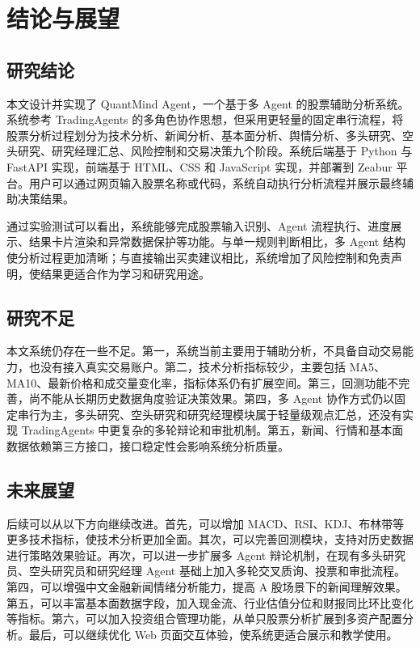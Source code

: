 \documentclass[UTF8,a4paper,12pt]{ctexart}
\begin{document}
\section{结论与展望}

\subsection{研究结论}

本文设计并实现了 QuantMind Agent，一个基于多 Agent 的股票辅助分析系统。系统参考 TradingAgents 的多角色协作思想，但采用更轻量的固定串行流程，将股票分析过程划分为技术分析、新闻分析、基本面分析、舆情分析、多头研究、空头研究、研究经理汇总、风险控制和交易决策九个阶段。系统后端基于 Python 与 FastAPI 实现，前端基于 HTML、CSS 和 JavaScript 实现，并部署到 Zeabur 平台。用户可以通过网页输入股票名称或代码，系统自动执行分析流程并展示最终辅助决策结果。

通过实验测试可以看出，系统能够完成股票输入识别、Agent 流程执行、进度展示、结果卡片渲染和异常数据保护等功能。与单一规则判断相比，多 Agent 结构使分析过程更加清晰；与直接输出买卖建议相比，系统增加了风险控制和免责声明，使结果更适合作为学习和研究用途。

\subsection{研究不足}

本文系统仍存在一些不足。第一，系统当前主要用于辅助分析，不具备自动交易能力，也没有接入真实交易账户。第二，技术分析指标较少，主要包括 MA5、MA10、最新价格和成交量变化率，指标体系仍有扩展空间。第三，回测功能不完善，尚不能从长期历史数据角度验证决策效果。第四，多 Agent 协作方式仍以固定串行为主，多头研究、空头研究和研究经理模块属于轻量级观点汇总，还没有实现 TradingAgents 中更复杂的多轮辩论和审批机制。第五，新闻、行情和基本面数据依赖第三方接口，接口稳定性会影响系统分析质量。

\subsection{未来展望}

后续可以从以下方向继续改进。首先，可以增加 MACD、RSI、KDJ、布林带等更多技术指标，使技术分析更加全面。其次，可以完善回测模块，支持对历史数据进行策略效果验证。再次，可以进一步扩展多 Agent 辩论机制，在现有多头研究员、空头研究员和研究经理 Agent 基础上加入多轮交叉质询、投票和审批流程。第四，可以增强中文金融新闻情绪分析能力，提高 A 股场景下的新闻理解效果。第五，可以丰富基本面数据字段，加入现金流、行业估值分位和财报同比环比变化等指标。第六，可以加入投资组合管理功能，从单只股票分析扩展到多资产配置分析。最后，可以继续优化 Web 页面交互体验，使系统更适合展示和教学使用。
\end{document}
